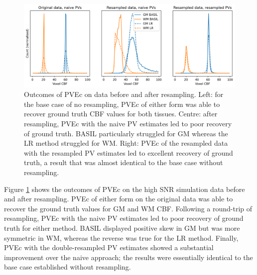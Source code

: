 \documentclass[12pt]{report}
\begin{document}
\begin{figure}[H]
\centering
\includegraphics[width = \textwidth]{sim_asl_resamp_pvec.png}
\caption{Outcomes of PVEc on data before and after resampling. Left: for the base case of no resampling, PVEc of either form was able to recover ground truth CBF values for both tissues. Centre: after resampling, PVEc with the naive PV estimates led to poor recovery of ground truth. BASIL particularly struggled for GM whereas the LR method struggled for WM. Right: PVEc of the resampled data with the resampled PV estimates led to excellent recovery of ground truth, a result that was almost identical to the base case without resampling.}
\label{sim_asl_resamp_pvec}
\end{figure}

Figure \ref{sim_asl_resamp_pvec} shows the outcomes of PVEc on the high SNR simulation data before and after resampling. PVEc of either form on the original data was able to recover the ground truth values for GM and WM CBF. Following a round-trip of resampling, PVEc with the naive PV estimates led to poor recovery of ground truth for either method. BASIL displayed positive skew in GM but was more symmetric in WM, whereas the reverse was true for the LR method. Finally, PVEc with the double-resampled PV estimates showed a substantial improvement over the naive approach; the results were essentially identical to the base case established without resampling. 
\end{document}
